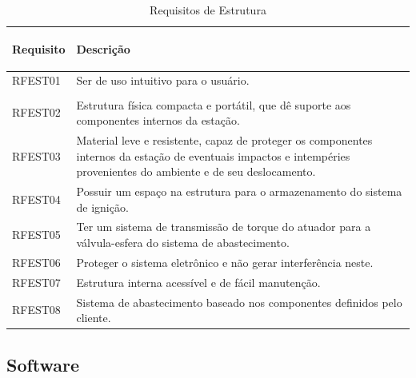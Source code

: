 \begin{table}[H]
\begin{tabular}{ | m{2cm} | m{12cm}| } 
 \hline
 \textbf{Requisito} & \begin{center}\textbf{Descrição}
   
 \end{center} \\ 
 \hline
 RFEST01 & Ser de uso intuitivo para o usuário.\\
 & \\
\hline
 RFEST02 & Estrutura física compacta e portátil, que dê suporte aos componentes internos da estação. \\
 \hline
 RFEST03 & Material leve e resistente, capaz de proteger os componentes internos da estação de eventuais impactos e intempéries provenientes do ambiente e de seu deslocamento. \\
  \hline
RFEST04 & Possuir um espaço na estrutura para o armazenamento do sistema de ignição. \\
\hline
RFEST05 & Ter um sistema de transmissão de torque do atuador para a válvula-esfera do sistema de abastecimento. \\
\hline
RFEST06 & Proteger o sistema eletrônico e não gerar interferência neste.  \\
\hline
RFEST07 & Estrutura interna acessível e de fácil manutenção. \\
\hline
RFEST08 & Sistema de abastecimento baseado nos componentes definidos pelo cliente. \\
\hline
\end{tabular}
\label{Requisitos de Estrutura}
\caption{Requisitos de Estrutura}
\end{table}

\subsection{Software}

